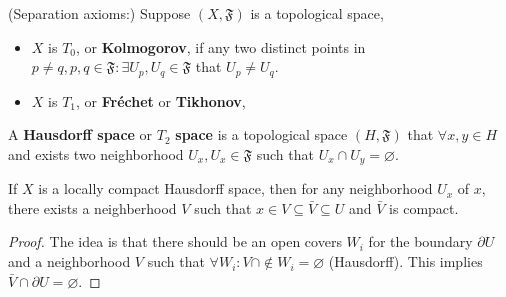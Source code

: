 \begin{definition}(Separation axioms:)
Suppose $(X,\mathfrak{F})$ is a topological space,
\begin{itemize}
\item $X$ is $T_0$, or \textbf{Kolmogorov}, if any two distinct points in $p\ne q,p,q\in\mathfrak{F}: \exists U_p,U_q\in\mathfrak{F}$ that $U_p\ne U_q$.
\item $X$ is $T_1$, or \textbf{Fr\'{e}chet} or \textbf{Tikhonov},  
\end{itemize}
\end{definition}

\begin{definition}
A \textbf{Hausdorff space} or $T_2$ \textbf{space} is a topological space $(H,\mathfrak{F})$ that $\forall x,y\in H$ and exists two neighborhood $U_x,U_x\in\mathfrak{F}$ such that $U_x\cap U_y=\varnothing$.
\end{definition} 


\begin{theorem}
If $X$ is a locally compact Hausdorff space, then for any neighborhood $U_x$ of $x$, there exists a neighberhood $V$ such that $x\in V\subseteq\bar V\subseteq U$ and $\bar V$ is compact.
\end{theorem}
\begin{proof}
The idea is that there should be an open covers ${W_i}$ for the boundary $\partial U$ and a neighborhood $V$ such that $\forall W_i: V\cap\notin W_i=\varnothing$ (Hausdorff). This implies $\bar V\cap \partial U=\varnothing$.  
\end{proof}